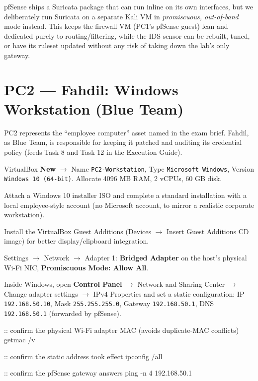\documentclass[11pt,a4paper]{article}
\begin{document}
\begin{notebox}
pfSense ships a Suricata package that can run inline on its own interfaces, but we
deliberately run Suricata on a separate Kali VM in \emph{promiscuous, out-of-band} mode
instead. This keeps the firewall VM (PC1's pfSense guest) lean and dedicated purely to
routing/filtering, while the IDS sensor can be rebuilt, tuned, or have its ruleset
updated without any risk of taking down the lab's only gateway.
\end{notebox}

\clearpage

\section{PC2 --- Fahdil: Windows Workstation (Blue Team)}
\label{sec:pc2}

PC2 represents the ``employee computer'' asset named in the exam brief. Fahdil, as
Blue Team, is responsible for keeping it patched and auditing its credential policy
(feeds Task 8 and Task 12 in the Execution Guide).

\begin{steps}
\item VirtualBox \textbf{New} $\to$ Name \texttt{PC2-Workstation}, Type \texttt{Microsoft Windows},
  Version \texttt{Windows 10 (64-bit)}. Allocate 4096 MB RAM, 2 vCPUs, 60 GB disk.
\item Attach a Windows 10 installer ISO and complete a standard installation with a
  local employee-style account (no Microsoft account, to mirror a realistic corporate
  workstation).
\item Install the VirtualBox Guest Additions (Devices $\to$ Insert Guest Additions CD
  image) for better display/clipboard integration.
\item Settings $\to$ Network $\to$ Adapter 1: \textbf{Bridged Adapter} on the host's
  physical Wi-Fi NIC, \textbf{Promiscuous Mode: Allow All}.
\item Inside Windows, open \textbf{Control Panel} $\to$ Network and Sharing Center
  $\to$ Change adapter settings $\to$ IPv4 Properties and set a static configuration:
  IP \texttt{192.168.50.10}, Mask \texttt{255.255.255.0}, Gateway \texttt{192.168.50.1},
  DNS \texttt{192.168.50.1} (forwarded by pfSense).
\end{steps}

\begin{cmdbox}
\begin{cmdverb}
:: confirm the physical Wi-Fi adapter MAC (avoids duplicate-MAC conflicts)
getmac /v

:: confirm the static address took effect
ipconfig /all

:: confirm the pfSense gateway answers
ping -n 4 192.168.50.1
\end{cmdverb}
\end{cmdbox}
\end{document}
